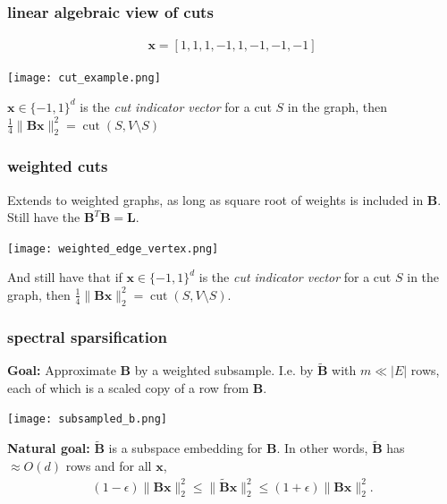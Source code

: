 \documentclass[compress]{beamer}
\newcommand{\bv}[1]{\mathbf{#1}}
\DeclareMathOperator{\cut}{cut}
\begin{document}
\begin{frame}
	\frametitle{linear algebraic view of cuts}
	\begin{align*}
		\bv{x} = [1,1,1,-1,1,-1,-1,-1]
	\end{align*}
	\begin{center}
		\texttt{[image: cut\_example.png]}
	\end{center}
	\vspace{-1em}
	$\bv{x}\in \{-1,1\}^d$ is the \emph{cut indicator vector} for a cut $S$ in the graph, then $\frac{1}{4}\|\bv{B}\bv{x}\|_2^2 = \cut(S,V\setminus S)$	
\end{frame}

\begin{frame}
	\frametitle{weighted cuts}
	Extends to weighted graphs, as long as square root of weights is included in $\bv{B}$. Still have the $\bv{B}^T\bv{B} = \bv{L}$.
	\begin{center}
		\texttt{[image: weighted\_edge\_vertex.png]}
	\end{center}
	\vspace{-1em}
	
	And still have that if $\bv{x}\in \{-1,1\}^d$ is the \emph{cut indicator vector} for a cut $S$ in the graph, then $\frac{1}{4}\|\bv{B}\bv{x}\|_2^2 = \cut(S,V\setminus S)$.	
\end{frame}

\begin{frame}
	\frametitle{spectral sparsification}
	\textbf{Goal:} Approximate $\bv{B}$ by a weighted subsample. I.e. by $\tilde{\bv{B}}$ with $m \ll |E|$ rows, each of which is a scaled copy of a row from $\bv{B}$. 
	\begin{center}
		\texttt{[image: subsampled\_b.png]}
	\end{center}
\textbf{Natural goal:} $\tilde{\bv{B}}$ is a subspace embedding for $\bv{B}$. In other words, $\tilde{\bv{B}}$ has $\approx O(d)$ rows and for all $\bv{x}$,
\begin{align*}
	(1-\epsilon)\|\bv{B}\bv{x}\|_2^2 \leq \|\tilde{\bv{B}}\bv{x}\|_2^2 \leq (1+\epsilon)\|\bv{B}\bv{x}\|_2^2.
\end{align*} 
\end{frame}
\end{document}
